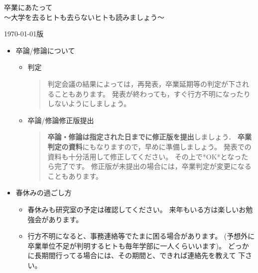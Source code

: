 \documentclass[11pt]{jarticle}
\begin{document}
\pagestyle{empty}

\begin{center}
  {\LARGE 卒業にあたって}\\
  {\Large 〜大学を去るヒトも去らないヒトも読みましょう〜}
\end{center}
\begin{flushright}
{\today 版}
\end{flushright}

\begin{itemize}
\item 卒論/修論について
  \begin{itemize}
  \item 判定
  \begin{quote}
    判定会議の結果によっては，再発表，卒業延期等の判定が下されることもあります。
    発表が終わっても，すぐ行方不明になったりしないようにしましょう。
  \end{quote}
  \item 卒論/修論修正版提出
  \begin{quote}
    \textbf{卒論・修論は指定された日までに修正版を提出}しましょう．
    \textbf{卒業判定の資料}にもなりますので，早めに準備しましょう。
    発表での資料も十分活用して修正してください。
    その上で*OK*となったら完了です。
    修正版が未提出の場合には，卒業判定が変更になることもあります。
  \end{quote}
  \end{itemize}
\item 春休みの過ごし方
  \begin{itemize}
  \item 春休みも研究室の予定は確認してください。
    来年もいる方は楽しいお勉強会があります。
  \item  行方不明になると、事務連絡等でたまに困る場合があります。
    (予想外に卒業単位不足が判明するヒトも毎年学部に一人くらいいます)。
    どっかに長期間行ってる場合には、その期間と、できれば連絡先を教えて
    下さい。
  \end{itemize}


\end{itemize}
\end{document}
